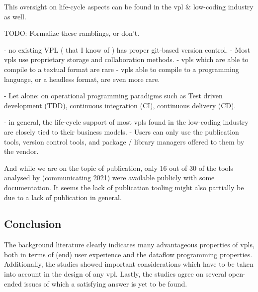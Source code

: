 This oversight on life-cycle aspects can be found in the \ac{vpl} \& low-coding industry as well. 
\begin{note}
TODO: Formalize these ramblings, or don't. 

- no existing VPL ( that I know of ) has proper git-based version control. 
  - Most vpls use proprietary storage and collaboration methods. 
- vpls which are able to compile to a textual format are rare
  - vpls able to compile to a programming language, or a headless format, are even more rare. 

- Let alone: on operational programming paradigms such as Test driven development (TDD), continuous integration (CI), continuous delivery (CD).  

- in general, the life-cycle support of most vpls found in the low-coding industry are closely tied to their business models. 
  - Users can only use the publication tools, version control tools, and package / library managers offered to them by the vendor.

\end{note}

And while we are on the topic of publication, only 16 out of 30 of the tools analysed by (communicating 2021) were available publicly with some documentation.
It seems the lack of publication tooling might also partially be due to a lack of publication in general. 

\subsection{Conclusion}

The background literature clearly indicates many advantageous properties of vpls, both in terms of (end) user experience and the dataflow programming properties. 
Additionally, the studies showed important considerations which have to be taken into account in the design of any vpl.  
Lastly, the studies agree on several open-ended issues of which a satisfying answer is yet to be found. 


